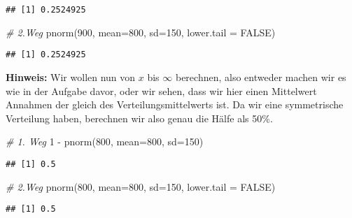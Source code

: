 \documentclass[
]{article}
\newenvironment{Shaded}{\begin{snugshade}}{\end{snugshade}}
\newcommand{\AttributeTok}[1]{\textcolor[rgb]{0.77,0.63,0.00}{#1}}
\newcommand{\CommentTok}[1]{\textcolor[rgb]{0.56,0.35,0.01}{\textit{#1}}}
\newcommand{\ConstantTok}[1]{\textcolor[rgb]{0.00,0.00,0.00}{#1}}
\newcommand{\DecValTok}[1]{\textcolor[rgb]{0.00,0.00,0.81}{#1}}
\newcommand{\FunctionTok}[1]{\textcolor[rgb]{0.00,0.00,0.00}{#1}}
\newcommand{\NormalTok}[1]{#1}
\newcommand{\SpecialCharTok}[1]{\textcolor[rgb]{0.00,0.00,0.00}{#1}}
\begin{document}
\begin{verbatim}
## [1] 0.2524925
\end{verbatim}

\begin{Shaded}
\begin{Highlighting}[]
\CommentTok{\# 2.Weg}
\FunctionTok{pnorm}\NormalTok{(}\DecValTok{900}\NormalTok{, }\AttributeTok{mean=}\DecValTok{800}\NormalTok{, }\AttributeTok{sd=}\DecValTok{150}\NormalTok{, }\AttributeTok{lower.tail =} \ConstantTok{FALSE}\NormalTok{)}
\end{Highlighting}
\end{Shaded}

\begin{verbatim}
## [1] 0.2524925
\end{verbatim}

\textbf{Hinweis:} Wir wollen nun von \(x\) bis \(\infty\) berechnen,
also entweder machen wir es wie in der Aufgabe davor, oder wir sehen,
dass wir hier einen Mittelwert Annahmen der gleich des
Verteilungsmittelwerts ist. Da wir eine symmetrische Verteilung haben,
berechnen wir also genau die Hälfe als 50\%.

\begin{Shaded}
\begin{Highlighting}[]
\CommentTok{\# 1. Weg}
\DecValTok{1} \SpecialCharTok{{-}} \FunctionTok{pnorm}\NormalTok{(}\DecValTok{800}\NormalTok{, }\AttributeTok{mean=}\DecValTok{800}\NormalTok{, }\AttributeTok{sd=}\DecValTok{150}\NormalTok{)}
\end{Highlighting}
\end{Shaded}

\begin{verbatim}
## [1] 0.5
\end{verbatim}

\begin{Shaded}
\begin{Highlighting}[]
\CommentTok{\# 2.Weg}
\FunctionTok{pnorm}\NormalTok{(}\DecValTok{800}\NormalTok{, }\AttributeTok{mean=}\DecValTok{800}\NormalTok{, }\AttributeTok{sd=}\DecValTok{150}\NormalTok{, }\AttributeTok{lower.tail =} \ConstantTok{FALSE}\NormalTok{)}
\end{Highlighting}
\end{Shaded}

\begin{verbatim}
## [1] 0.5
\end{verbatim}
\end{document}

